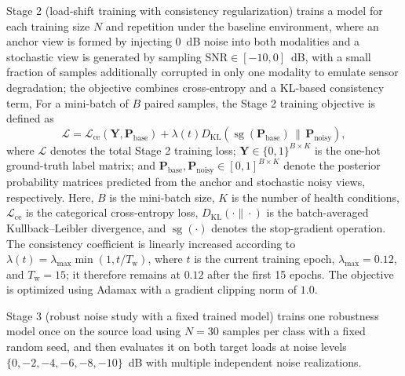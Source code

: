 \documentclass[a4paper]{cas-sc}
\begin{document}
Stage 2 (load-shift training with consistency regularization) trains a model for each training size $N$ and repetition under the baseline environment, where an anchor view is formed by injecting $0$~dB noise into both modalities and a stochastic view is generated by sampling $\mathrm{SNR}\in[-10,0]$~dB, with a small fraction of samples additionally corrupted in only one modality to emulate sensor degradation; the objective combines cross-entropy and a KL-based consistency term,
For a mini-batch of $B$ paired samples, the Stage 2 training
objective is defined as
\begin{equation}
\mathcal{L}
=
\mathcal{L}_{\mathrm{ce}}
\!\left(
\mathbf{Y},
\mathbf{P}_{\mathrm{base}}
\right)
+
\lambda(t)
D_{\mathrm{KL}}
\!\left(
\operatorname{sg}
\!\left(
\mathbf{P}_{\mathrm{base}}
\right)
\,\|\, 
\mathbf{P}_{\mathrm{noisy}}
\right),
\label{eq:stage2_loss}
\end{equation}
where $\mathcal{L}$ denotes the total Stage 2 training loss;
$\mathbf{Y}\in\{0,1\}^{B\times K}$ is the one-hot ground-truth
label matrix; and
$\mathbf{P}_{\mathrm{base}},\mathbf{P}_{\mathrm{noisy}}
\in[0,1]^{B\times K}$ denote the posterior probability matrices
predicted from the anchor and stochastic noisy views, respectively.
Here, $B$ is the mini-batch size, $K$ is the number of health conditions, $\mathcal{L}_{\mathrm{ce}}$ is the categorical
cross-entropy loss, $D_{\mathrm{KL}}(\cdot\|\cdot)$ is the
batch-averaged Kullback--Leibler divergence, and
$\operatorname{sg}(\cdot)$ denotes the stop-gradient operation.
The consistency coefficient is linearly increased according to
$\lambda(t)=\lambda_{\max}\min(1,t/T_{\mathrm{w}})$, where $t$
is the current training epoch, $\lambda_{\max}=0.12$, and
$T_{\mathrm{w}}=15$; it therefore remains at $0.12$ after the
first 15 epochs. The objective is optimized using Adamax with a
gradient clipping norm of $1.0$.

Stage 3 (robust noise study with a fixed trained model) trains one robustness model once on the source load using $N=30$ samples per class with a fixed random seed, and then evaluates it on both target loads at noise levels $\{0,-2,-4,-6,-8,-10\}$~dB with multiple independent noise realizations.
\end{document}
